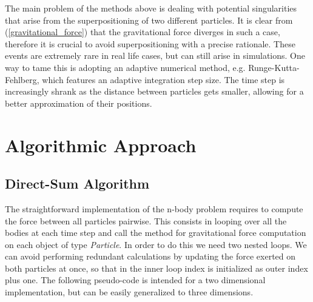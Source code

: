 \documentclass{article}
\begin{document}
The main problem of the methods above is dealing with potential singularities that arise from the superpositioning of two different particles. It is clear from (\ref{gravitational_force}) that the gravitational force diverges in such a case, therefore it is crucial to avoid superpositioning with a precise rationale. These events are extremely rare in real life cases, but can still arise in simulations. One way to tame this is adopting an adaptive numerical method, e.g. Runge-Kutta-Fehlberg, which features an adaptive integration step size. The time step is increasingly shrank as the distance between particles gets smaller, allowing for a better approximation of their positions. 

\section{Algorithmic Approach}
\subsection{Direct-Sum Algorithm}
The straightforward implementation of the n-body problem requires to compute the force between all particles pairwise. This consists in looping over all the bodies at each time step and call the method for gravitational force computation on each object of type \textit{Particle}. In order to do this we need two nested loops. We can avoid performing redundant calculations by updating the force exerted on both particles at once, so that in the inner loop index is initialized as outer index plus one. 
The following pseudo-code is intended for a two dimensional implementation, but can be easily generalized to three dimensions. \cite{PACHECO2022361} \\ \\ \\

\end{document}
